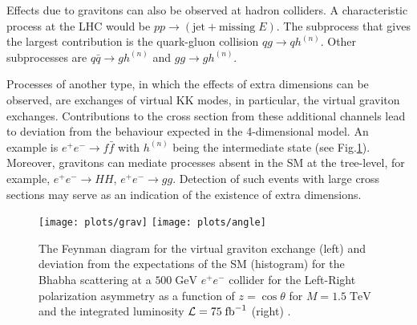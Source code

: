 \documentclass{cernyrep}
\begin{document}
Effects due to gravitons can also be observed at hadron colliders.
A characteristic process at the LHC would be $pp \rightarrow
(\mbox{jet} + \mbox{missing} \; E)$. The subprocess that gives the
largest contribution is the quark-gluon collision $qg \rightarrow
qh^{(n)}$. Other subprocesses are $q\bar{q} \rightarrow gh^{(n)}$
and $gg \rightarrow gh^{(n)}$.

Processes of another type, in which the effects of extra
dimensions can be observed, are exchanges of virtual KK modes, in
particular, the virtual graviton exchanges. Contributions to the
cross section from these additional channels lead to  deviation
from the behaviour expected in the 4-dimensional model.  An
example is $e^{+}e^{-} \rightarrow f \bar{f}$ with $h^{(n)}$ being
the intermediate state (see Fig.\ref{grav}). Moreover, gravitons
can mediate processes absent in the SM at the tree-level, for
example, $e^{+}e^{-} \rightarrow HH$, $e^{+}e^{-} \rightarrow gg$.
Detection of such events with  large  cross sections may serve as
an indication of the existence of extra dimensions.
\begin{figure}[htb]
\begin{center}
\leavevmode
\texttt{[image: plots/grav]}\hspace{1cm}
\texttt{[image: plots/angle]}
\end{center}
\caption{
The Feynman diagram for the virtual graviton exchange
(left) and deviation from the expectations of the SM (histogram)
for the Bhabha scattering at a $500 \; \mbox{GeV}$ $e^{+}e^{-}$
collider for the Left-Right polarization asymmetry as a function
of $z=\cos \theta$ for $M = 1.5 \; \mbox{TeV}$ and the integrated
luminosity ${\cal L}=75 \; \mbox{fb}^{-1}$ (right) \cite{Ri99}.} \label{grav}
\end{figure}
\end{document}
